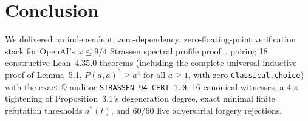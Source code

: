 \documentclass[10pt,twocolumn]{article}
\newcommand{\QQ}{\mathbb{Q}}
\begin{document}
\section{Conclusion}\label{sec:conc}
We delivered an independent, zero-dependency, zero-floating-point verification stack for OpenAI's $\omega\le 9/4$ Strassen spectral profile proof~\cite{openai2026omega94upper}, pairing 18 constructive Lean~4.35.0 theorems (including the complete universal inductive proof of Lemma~5.1, $P(a,a)^3\ge a^4$ for all $a\ge 1$, with zero \texttt{Classical.choice}) with the exact-$\QQ$ auditor \texttt{STRASSEN-94-CERT-1.0}, 16 canonical witnesses, a $4\times$ tightening of Proposition~3.1's degeneration degree, exact minimal finite refutation thresholds $a^*(t)$, and 60/60 live adversarial forgery rejections.



\end{document}
